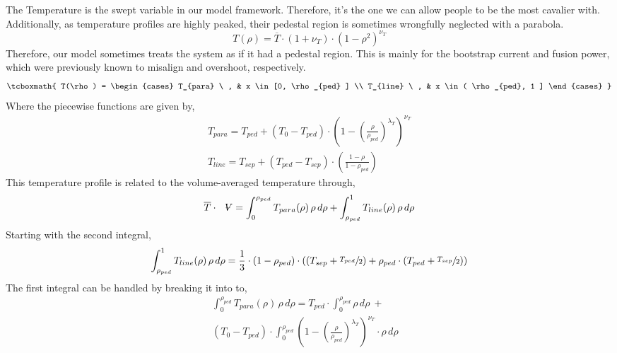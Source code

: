 The Temperature is the swept variable in our model framework. Therefore, it's the one we can allow people to be the most cavalier with. Additionally, as temperature profiles are highly peaked, their pedestal region is sometimes wrongfully neglected with a parabola.
\begin{equation}
	T(\rho) = \overline{T} \cdot \left(1 + \nu_T \right) \cdot \left( 1 - \rho^2  \right)^{\nu_T}
\end{equation}
Therefore, our model sometimes treats the system as if it had a pedestal region. This is mainly for the bootstrap current and fusion power, which were previously known to misalign and overshoot, respectively.
\begin{equation}
	\tcboxmath{
	T(\rho) =
	\begin{cases}
	    T_{para} \ , & x \in [0, \rho_{ped} ] \\
	    T_{line}   \ , & x \in ( \rho_{ped}, 1 ]
	\end{cases}
	}
\end{equation}
Where the piecewise functions are given by,
\begin{gather}
	T_{para} = T_{ped} + ( T_{0} - T_{ped} ) \cdot \left( 1 - \left( \frac{\rho}{\rho_{ped}} \right)^{\lambda_T} \right)^{\nu_T} \\
	T_{line} = T_{sep} + ( T_{ped} - T_{sep} ) \cdot \left( \frac{ 1 - \rho }{ 1 - \rho_{ped} } \right)
\end{gather}
This temperature profile is related to the volume-averaged temperature through,
\begin{equation}
	\overline{T} \cdot \volume = \int_0^{\rho_{ped}} T_{para}(\rho) \, \rho \, d\rho + \int_{\rho_{ped}}^1 T_{line}(\rho) \, \rho \, d\rho
\end{equation}
Starting with the second integral,
\begin{equation}
	\int_{\rho_{ped}}^1 T_{line}(\rho) \, \rho \, d\rho = \frac{1}{3} \cdot ( 1 - \rho_{ped} ) \cdot \left( \left( T_{sep} + \sfrac{ T_{ped} }{2} \right) + \rho_{ped} \cdot \left( T_{ped} + \sfrac{ T_{sep} }{2}  \right)  \right)
\end{equation}
The first integral can be handled by breaking it into to,
\begin{multline}
	\int_0^{\rho_{ped}} T_{para}(\rho) \, \rho \, d\rho = T_{ped} \cdot \int_0^{\rho_{ped}} \rho \, d\rho \ + \\ ( T_{0} - T_{ped} ) \cdot \int_0^{\rho_{ped}} \left( 1 - \left( \frac{\rho}{\rho_{ped}} \right)^{\lambda_T} \right)^{\nu_T}  \cdot \rho \, d\rho \ \ \  \
\end{multline}

